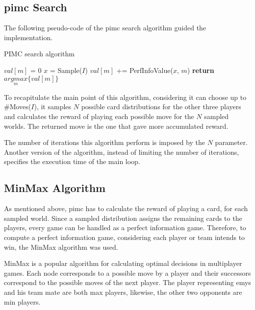 \subsection*{\ac{pimc} Search}

The following pseudo-code of the \ac{pimc} search algorithm guided the implementation.

\begin{algorithm}
	\caption{PIMC search algorithm}
	\begin{algorithmic}[1]
				\State $val[m]$ = 0
			\EndFor
				\State $x$ = Sample($I$)
					\State $val[m]$ += PerfInfoValue($x$, $m$)
				\EndFor
			\EndFor
			\State \textbf{return} $\underset{m}{argmax}\{ val[m] \}$
		\EndProcedure
	\end{algorithmic}
\end{algorithm}

To recapitulate the main point of this algorithm, considering it can choose up to \#Moves($I$), it samples $N$ possible card distributions for the other three players and calculates the reward of playing each possible move for the $N$ sampled worlds.
The returned move is the one that gave more accumulated reward.

The number of iterations this algorithm perform is imposed by the $N$ parameter.
Another version of the algorithm, instead of limiting the number of iterations, specifies the execution time of the main loop.

\subsection*{MinMax Algorithm}

As mentioned above, \ac{pimc} has to calculate the reward of playing a card, for each sampled world.
Since a sampled distribution assigns the remaining cards to the players, every game can be handled as a perfect information game.
Therefore, to compute a perfect information game, considering each player or team intends to win, the MinMax algorithm was used.

MinMax is a popular algorithm for calculating optimal decisions in multiplayer games.
Each node corresponds to a possible move by a player and their successors correspond to the possible moves of the next player.
The player representing \ac{emys} and his team mate are both max players, likewise, the other two opponents are min players.

